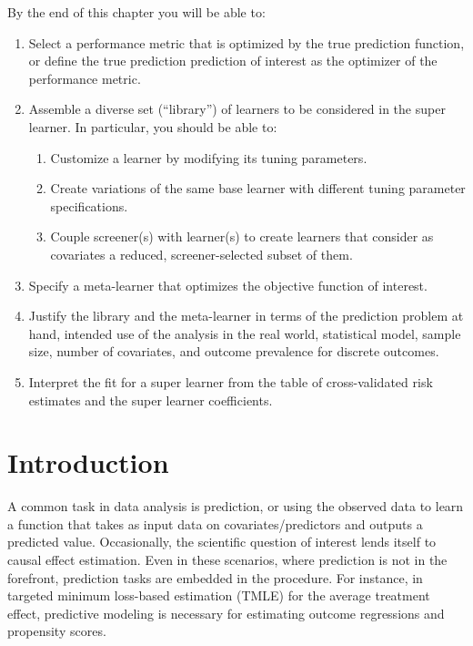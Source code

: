 \documentclass[
  12pt, krantz2,
]{krantz}
\providecommand{\tightlist}{%
  \setlength{\itemsep}{0pt}\setlength{\parskip}{0pt}}
\newcommand{\1}{\mathbbm{1}}
\theoremstyle{definition}
\theoremstyle{definition}
\theoremstyle{definition}
\theoremstyle{definition}
\theoremstyle{remark}
\begin{document}
By the end of this chapter you will be able to:

\begin{enumerate}
\def\labelenumi{\arabic{enumi}.}
\item
  Select a performance metric that is optimized by the true prediction
  function, or define the true prediction prediction of interest as the
  optimizer of the performance metric.
\item
  Assemble a diverse set (``library'') of learners to be considered in the super
  learner. In particular, you should be able to:

  \begin{enumerate}
  \def\labelenumii{\alph{enumii}.}
  \tightlist
  \item
    Customize a learner by modifying its tuning parameters.
  \item
    Create variations of the same base learner with different tuning
    parameter specifications.
  \item
    Couple screener(s) with learner(s) to create learners that consider as
    covariates a reduced, screener-selected subset of them.
  \end{enumerate}
\item
  Specify a meta-learner that optimizes the objective function of interest.
\item
  Justify the library and the meta-learner in terms of the prediction problem
  at hand, intended use of the analysis in the real world, statistical model,
  sample size, number of covariates, and outcome prevalence for discrete
  outcomes.
\item
  Interpret the fit for a super learner from the table of cross-validated risk
  estimates and the super learner coefficients.
\end{enumerate}

\hypertarget{introduction-3}{%
\section{Introduction}\label{introduction-3}}

A common task in data analysis is prediction, or using the observed data to
learn a function that takes as input data on covariates/predictors and outputs a
predicted value. Occasionally, the scientific question of interest lends itself
to causal effect estimation. Even in these scenarios, where prediction is not in
the forefront, prediction tasks are embedded in the procedure. For instance, in
targeted minimum loss-based estimation (TMLE) for the average treatment effect,
predictive modeling is necessary for estimating outcome regressions and propensity scores.
\end{document}
